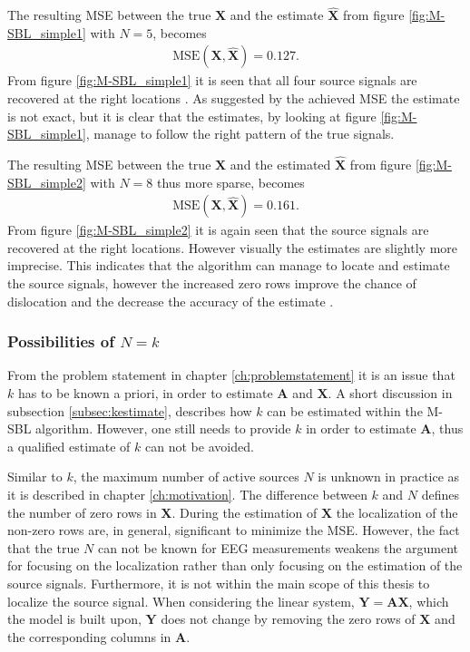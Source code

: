 \noindent
The resulting MSE between the true $\mathbf{X}$ and the estimate $\hat{\mathbf{X}}$ from figure \ref{fig:M-SBL_simple1} with $N = 5$, becomes 
\begin{align*}
\text{MSE}(\mathbf{X}, \hat{\mathbf{X}}) = 0.127.
\end{align*}
From figure \ref{fig:M-SBL_simple1} it is seen that all four source signals are recovered at the right locations . 
As suggested by the achieved MSE the estimate is not exact, but it is clear that the estimates, by looking at figure \ref{fig:M-SBL_simple1}, manage to follow the right pattern of the true signals. 

The resulting MSE between the true $\mathbf{X}$ and the estimated $\hat{\mathbf{X}}$ from figure \ref{fig:M-SBL_simple2} with $N = 8$ thus more sparse, becomes 
\begin{align*}
\text{MSE}(\mathbf{X}, \hat{\mathbf{X}}) = 0.161. 
\end{align*}
From figure \ref{fig:M-SBL_simple2} it is again seen that the source signals are recovered at the right locations. 
However visually the estimates are slightly more imprecise. 
This indicates that the algorithm can manage to locate and estimate the source signals, however the increased zero rows improve the chance of dislocation and the decrease the accuracy of the estimate .     

\subsubsection*{Possibilities of $N=k$}
From the problem statement in chapter \ref{ch:problemstatement} it is an issue that $k$ has to be known a priori, in order to estimate $\mathbf{A}$ and $\mathbf{X}$. 
A short discussion in subsection \ref{subsec:kestimate}, describes how $k$ can be estimated within the M-SBL algorithm. 
However, one still needs to provide $k$ in order to estimate $\mathbf{A}$, thus a qualified estimate of $k$ can not be avoided. 

Similar to $k$, the maximum number of active sources $N$ is unknown in practice as it is described in chapter \ref{ch:motivation}. 
The difference between $k$ and $N$ defines the number of zero rows in $\mathbf{X}$.
During the estimation of $\mathbf{X}$ the localization of the non-zero rows are, in general, significant to minimize the MSE. 
However, the fact that the true $N$ can not be known for EEG measurements weakens the argument for focusing on the localization rather than only focusing on the estimation of the source signals. 
Furthermore, it is not within the main scope of this thesis to localize the source signal. 
When considering the linear system, $\mathbf{Y} = \mathbf{AX}$, which the model is built upon, $\mathbf{Y}$ does not change by removing the zero rows of $\mathbf{X}$ and the corresponding columns in $\mathbf{A}$.

